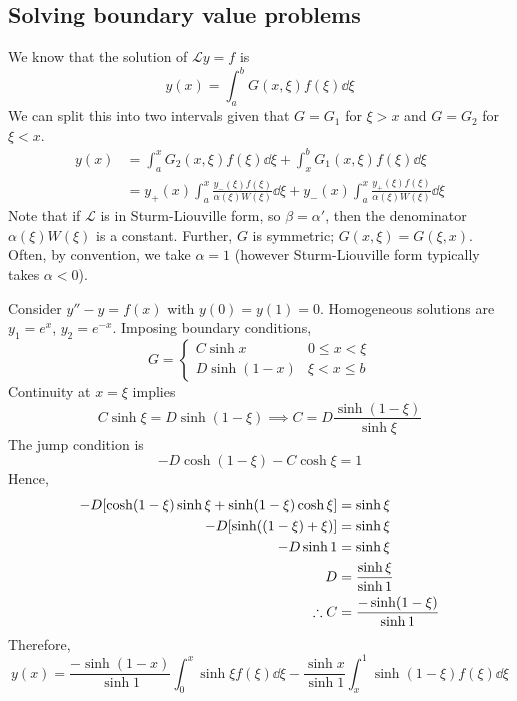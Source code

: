 \subsection{Solving boundary value problems}
We know that the solution of \( \mathcal L y = f \) is
\[
	y(x) = \int_a^b G(x,\xi) f(\xi) \dd{\xi}
\]
We can split this into two intervals given that \( G = G_1 \) for \( \xi > x \) and \( G = G_2 \) for \( \xi < x \).
\begin{align*}
	y(x) & = \int_a^x G_2(x,\xi) f(\xi) \dd{\xi} + \int_x^b G_1(x,\xi) f(\xi) \dd{\xi}                                                               \\
	     & = y_+(x) \int_a^x \frac{y_-(\xi) f(\xi)}{\alpha(\xi)W(\xi)} \dd{\xi} + y_-(x) \int_a^x \frac{y_+(\xi) f(\xi)}{\alpha(\xi)W(\xi)} \dd{\xi}
\end{align*}
Note that if \( \mathcal L \) is in Sturm-Liouville form, so \( \beta = \alpha' \), then the denominator \( \alpha(\xi)W(\xi) \) is a constant.
Further, \( G \) is symmetric; \( G(x,\xi) = G(\xi,x) \).
Often, by convention, we take \( \alpha = 1 \) (however Sturm-Liouville form typically takes \( \alpha < 0 \)).
\begin{example}
	Consider \( y'' - y = f(x) \) with \( y(0) = y(1) = 0 \).
	Homogeneous solutions are \( y_1 = e^x \), \( y_2 = e^{-x} \).
	Imposing boundary conditions,
	\[
		G = \begin{cases}
			C \sinh x    & 0 \leq x < \xi \\
			D \sinh(1-x) & \xi < x \leq b
		\end{cases}
	\]
	Continuity at \( x = \xi \) implies
	\[
		C \sinh \xi = D \sinh (1 - \xi) \implies C = D \frac{\sinh (1-\xi)}{\sinh \xi}
	\]
	The jump condition is
	\[
		-D \cosh(1-\xi) - C \cosh \xi = 1
	\]
	Hence,
	\begin{align*}
		-D\qty[\cosh(1-\xi)\sinh \xi + \sinh(1-\xi)\cosh \xi] & = \sinh \xi                     \\
		-D\qty[\sinh((1-\xi) + \xi)]                          & = \sinh \xi                     \\
		-D\sinh 1                                             & = \sinh \xi                     \\
		D                                                     & = \frac{\sinh \xi}{\sinh 1}     \\
		\therefore C                                          & = \frac{-\sinh(1-\xi)}{\sinh 1}
	\end{align*}
	Therefore,
	\[
		y(x) = \frac{-\sinh(1-x)}{\sinh 1} \int_0^x \sinh \xi f(\xi) \dd{\xi} - \frac{\sinh x}{\sinh 1} \int_x^1 \sinh (1-\xi) f(\xi) \dd{\xi}
	\]
\end{example}
